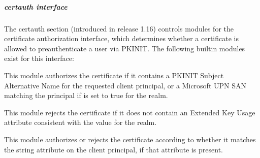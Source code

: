 \documentclass[letterpaper,10pt,english]{sphinxmanual}
\begin{document}
\subparagraph{certauth interface}
\label{\detokenize{admin/conf_files/krb5_conf:certauth-interface}}\label{\detokenize{admin/conf_files/krb5_conf:certauth}}
\sphinxAtStartPar
The certauth section (introduced in release 1.16) controls modules for
the certificate authorization interface, which determines whether a
certificate is allowed to preauthenticate a user via PKINIT.  The
following built\sphinxhyphen{}in modules exist for this interface:
\begin{description}
\sphinxAtStartPar
This module authorizes the certificate if it contains a PKINIT
Subject Alternative Name for the requested client principal, or a
Microsoft UPN SAN matching the principal if 
is set to true for the realm.

\sphinxAtStartPar
This module rejects the certificate if it does not contain an
Extended Key Usage attribute consistent with the
 value for the realm.

\sphinxAtStartPar
This module authorizes or rejects the certificate according to
whether it matches the  string attribute on
the client principal, if that attribute is present.

\end{description}
\end{document}
